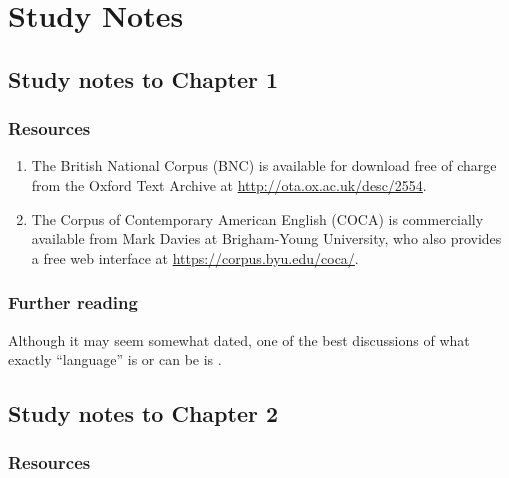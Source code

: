 \chapter{Study Notes}
\label{ch:studynotes}

\section{Study notes to Chapter 1}
\label{sec:studynotes01}

\subsection*{Resources}

\begin{enumerate}
  \item The British National Corpus (BNC) is available for download free of charge from the Oxford Text Archive at \url{http://ota.ox.ac.uk/desc/2554}.
  \item The Corpus of Contemporary American English (COCA) is commercially available from Mark Davies at Brigham-Young University, who also provides a free web interface at \url{https://corpus.byu.edu/coca/}.
\end{enumerate}

\subsection*{Further reading}

Although it may seem somewhat dated, one of the best discussions of what exactly ``language'' is or can be is \citet{lyons_language_1981}.

\section{Study notes to Chapter 2}
\label{sec:studynotes02}

\subsection*{Resources}

